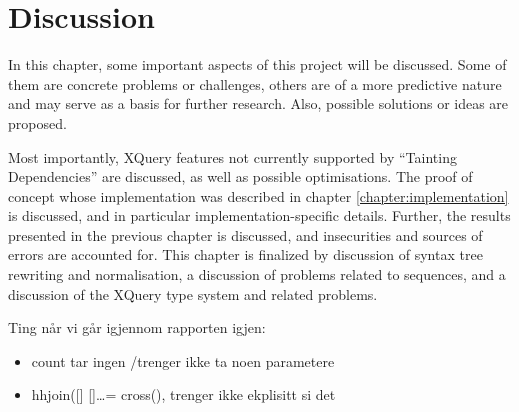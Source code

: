\chapter{Discussion}
\label{chapter:discussion}
In this chapter, some important aspects of this project will be discussed. Some
of them are concrete problems or challenges, others are of a more predictive
nature and may serve as a basis for further research. Also, possible
solutions or ideas are proposed. 

Most importantly, XQuery features not
currently supported by ``Tainting Dependencies'' are discussed, as well as
possible optimisations. The proof of concept whose implementation was
described in chapter \ref{chapter:implementation} is discussed, and in
particular implementation-specific details. Further, the results presented in
the previous chapter is discussed, and insecurities and sources of errors are
accounted for. This chapter is finalized by discussion of syntax tree rewriting
and normalisation, a discussion of problems related to sequences, and a
discussion of the XQuery type system and related problems.


Ting n\aa r vi g\aa r igjennom rapporten igjen:
\begin{itemize}
  \item count tar ingen /trenger ikke ta noen parametere
  \item hhjoin([] []\ldots = cross(), trenger ikke ekplisitt si det
\end{itemize}








